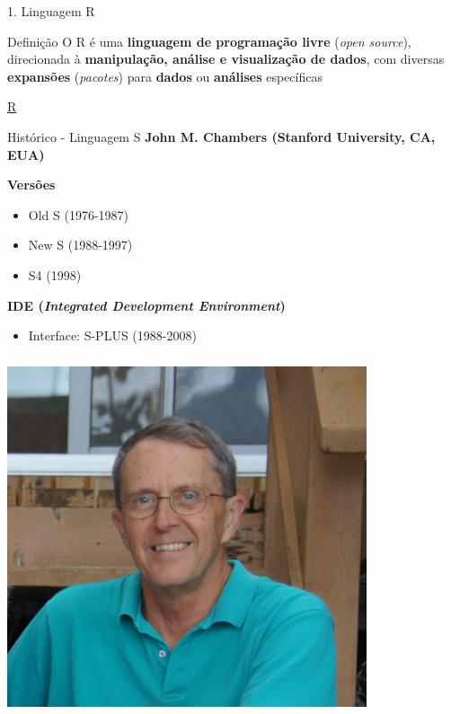 \documentclass[
  ignorenonframetext,
]{beamer}
\providecommand{\tightlist}{%
  \setlength{\itemsep}{0pt}\setlength{\parskip}{0pt}}\usepackage{longtable,booktabs,array}
\begin{document}
\begin{frame}{1. Linguagem R}
\protect\hypertarget{linguagem-r}{}
\begin{block}{Definição}
\protect\hypertarget{definiuxe7uxe3o}{}
O R é uma \textbf{linguagem de programação livre} (\emph{open source}),
direcionada à \textbf{manipulação, análise e visualização de dados}, com
diversas \textbf{expansões} (\emph{pacotes}) para \textbf{dados} ou
\textbf{análises} específicas

\href{https://www.r-project.org/}{R}
\end{block}

\begin{block}{Histórico - Linguagem S}
\protect\hypertarget{histuxf3rico---linguagem-s}{}
\textbf{John M. Chambers (Stanford University, CA, EUA)}

\textbf{Versões}

\begin{itemize}
\tightlist
\item
  Old S (1976-1987)
\item
  New S (1988-1997)
\item
  S4 (1998)
\end{itemize}

\textbf{IDE (\emph{Integrated Development Environment})}

\begin{itemize}
\tightlist
\item
  Interface: S-PLUS (1988-2008)
\end{itemize}

\includegraphics[width=4.16667in,height=4.16667in]{img/person_john_chambers.jpg}


\end{block}
\end{frame}
\end{document}
